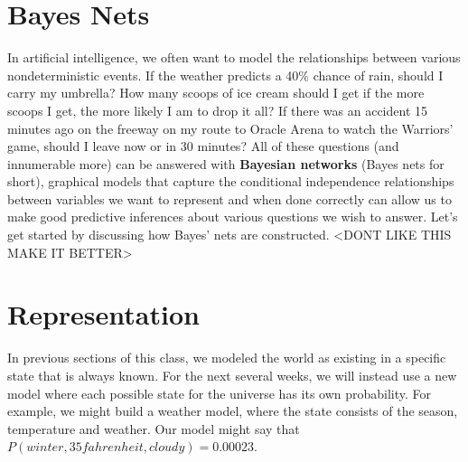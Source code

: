 \documentclass[11pt,fleqn]{article}
\def\title{Note \the\lecturenumber}
\begin{document}
\maketitle

\section*{Bayes Nets}
In artificial intelligence, we often want to model the relationships between various nondeterministic events. If the weather predicts a 40\% chance of rain, should I carry my umbrella? How many scoops of ice cream should I get if the more scoops I get, the more likely I am to drop it all? If there was an accident 15 minutes ago on the freeway on my route to Oracle Arena to watch the Warriors' game, should I leave now or in 30 minutes? All of these questions (and innumerable more) can be answered with \textbf{Bayesian networks} (Bayes nets for short), graphical models that capture the conditional independence relationships between variables we want to represent and when done correctly can allow us to make good predictive inferences about various questions we wish to answer. Let's get started by discussing how Bayes' nets are constructed. <DONT LIKE THIS MAKE IT BETTER>

\section*{Representation}

In previous sections of this class, we modeled the world as existing in a specific state that is always known. For the next several weeks, we will instead use a new model where each possible state for the universe has its own probability. For example, we might build a weather model, where the state consists of the season, temperature and weather. Our model might say that $P(winter, 35 fahrenheit, cloudy) = 0.00023$.


\end{document}
\end{document}

